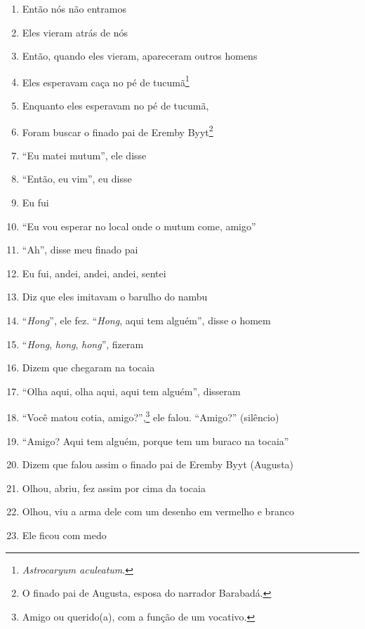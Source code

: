 \begin{enumerate}
{   paras as aldeias por agentes públicos, missionários, garimpeiros e
   madeireiros, por exemplo, malária, sarampo, gripe, tuberculose etc.}
 \item Então nós não entramos
 \item Eles vieram atrás de nós
 \begin{center}\end{center}
 \item Então, quando eles vieram, apareceram outros homens
 \item Eles esperavam caça no pé de tucumã\footnote{\textit{Astrocaryum
   aculeatum}.}
 \item Enquanto eles esperavam no pé de tucumã,
 \item Foram buscar o finado pai de Eremby Byyt\footnote{O finado pai de
   Augusta, esposa do narrador Barabadá.}
 \item ``Eu matei mutum'', ele disse
 \item ``Então, eu vim'', eu disse
 \item Eu fui
 \item ``Eu vou esperar no local onde o mutum come, amigo''
 \item ``Ah'', disse meu finado pai
 \begin{center}\end{center}
 \item Eu fui, andei, andei, andei, sentei
 \item Diz que eles imitavam o barulho do nambu
 \item ``\textit{Hong}'', ele fez. ``\textit{Hong}, aqui tem alguém'', disse o homem
 \item ``\textit{Hong}, \textit{hong}, \textit{hong}'', fizeram
 \item Dizem que chegaram na tocaia
 \item ``Olha aqui, olha aqui, aqui tem alguém'', disseram
 \item ``Você matou cotia, amigo?'',\footnote{Amigo ou querido(a), com a função
   de um vocativo.} ele falou. ``Amigo?'' (silêncio)
 \item ``Amigo? Aqui tem alguém, porque tem um buraco na tocaia''
 \item Dizem que falou assim o finado pai de Eremby Byyt (Augusta)
 \item Olhou, abriu, fez assim por cima da tocaia
 \item Olhou, viu a arma dele com um desenho em vermelho e branco
 \item Ele ficou com medo
 \begin{center}\end{center}

\end{enumerate}
